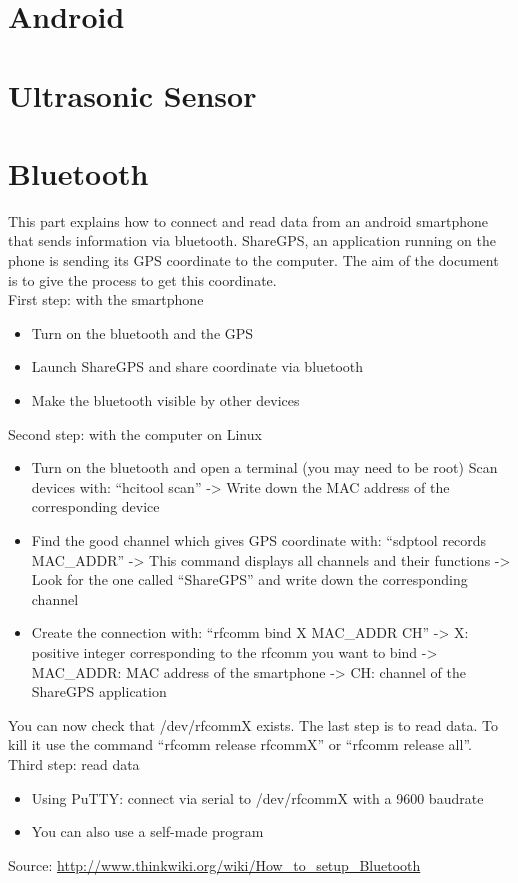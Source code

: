 \section{Android}

\section{Ultrasonic Sensor}

\section{Bluetooth}

This part explains how to connect and read data from an android smartphone that sends information via bluetooth. ShareGPS, an application running on the phone is sending its GPS coordinate to the computer. The aim of the document is to give the process to get this coordinate.\\

First step: with the smartphone\\

\begin{itemize}
 \item Turn on the bluetooth and the GPS
 \item Launch ShareGPS and share coordinate via bluetooth
 \item Make the bluetooth visible by other devices
\end{itemize}

Second step: with the computer on Linux\\

\begin{itemize}
   \item  Turn on the bluetooth and open a terminal (you may need to be root)
   Scan devices with: ``hcitool scan''
   -> Write down the MAC address of the corresponding device
   \item Find the good channel which gives GPS coordinate with: ``sdptool records MAC\_ADDR''
   -> This command displays all channels and their functions
   -> Look for the one called ``ShareGPS'' and write down the corresponding channel
   \item Create the connection with: ``rfcomm bind X MAC\_ADDR CH''
    -> X: positive integer corresponding to the rfcomm you want to bind
    -> MAC\_ADDR: MAC address of the smartphone
    -> CH: channel of the ShareGPS application
\end{itemize}

You can now check that /dev/rfcommX exists. The last step is to read data.
To kill it use the command ``rfcomm release rfcommX'' or ``rfcomm release all''.\\

Third step: read data\\
\begin{itemize}
  \item Using PuTTY: connect via serial to /dev/rfcommX with a 9600 baudrate
  \item You can also use a self-made program
\end{itemize}

Source: \url{http://www.thinkwiki.org/wiki/How\_to\_setup\_Bluetooth}
